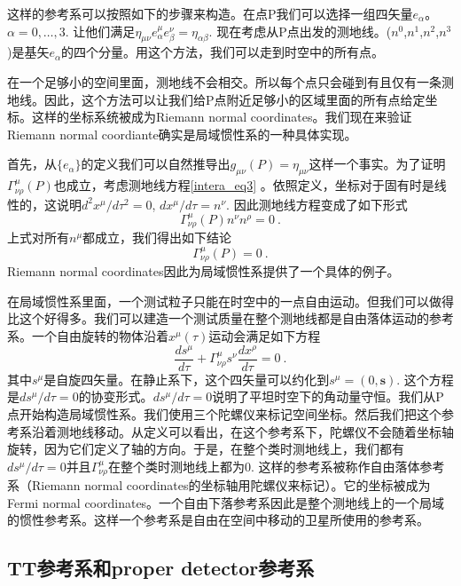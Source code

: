 这样的参考系可以按照如下的步骤来构造。在点P我们可以选择一组四矢量$e_\alpha$。$\alpha = 0,\ldots,3$. 让他们满足$\eta_{\mu\nu}e^\mu_\alpha e^\nu_\beta = \eta_{\alpha\beta}$. 现在考虑从P点出发的测地线。($n^0$,$n^1$,$n^2$,$n^3$)是基矢$e_\alpha$的四个分量。用这个方法，我们可以走到时空中的所有点。

在一个足够小的空间里面，测地线不会相交。所以每个点只会碰到有且仅有一条测地线。因此，这个方法可以让我们给P点附近足够小的区域里面的所有点给定坐标。这样的坐标系统被成为Riemann normal coordinates。我们现在来验证Riemann normal coordiante确实是局域惯性系的一种具体实现。

首先，从$\{e_{\alpha}\}$的定义我们可以自然推导出$g_{\mu\nu}(P) = \eta_{\mu\nu}$这样一个事实。为了证明$\Gamma^\mu_{\nu\rho}(P)$也成立，考虑测地线方程\autoref{intera_eq3} 。依照定义，坐标对于固有时是线性的，这说明$d^2 x^\mu/d \tau^2 = 0$, $dx^\mu/d\tau = n^\nu$. 因此测地线方程变成了如下形式
\begin{equation}
\Gamma^\mu_{\nu\rho} (P) n^\nu n^\rho = 0 ~.
\end{equation}
上式对所有$n^\mu$都成立，我们得出如下结论
\begin{equation}
\Gamma^\mu_{\nu\rho} (P) = 0~.
\end{equation}
Riemann normal coordinates因此为局域惯性系提供了一个具体的例子。

在局域惯性系里面，一个测试粒子只能在时空中的一点自由运动。但我们可以做得比这个好得多。我们可以建造一个测试质量在整个测地线都是自由落体运动的参考系。一个自由旋转的物体沿着$x^\mu(\tau)$运动会满足如下方程
\begin{equation}
\frac{ds^\mu}{d\tau} + \Gamma^\mu_{\nu\rho} s^\nu \frac{dx^\rho}{d\tau} = 0~.
\end{equation}
其中$s^\mu$是自旋四矢量。在静止系下，这个四矢量可以约化到$s^\mu = (0,\mathbf s)$. 这个方程是$ds^\mu/d\tau=0$的协变形式。$ds^\mu/d\tau=0$说明了平坦时空下的角动量守恒。我们从P点开始构造局域惯性系。我们使用三个陀螺仪来标记空间坐标。然后我们把这个参考系沿着测地线移动。从定义可以看出，在这个参考系下，陀螺仪不会随着坐标轴旋转，因为它们定义了轴的方向。于是，在整个类时测地线上，我们都有$ds^\mu/d\tau = 0$并且$\Gamma^\mu_{\nu\rho}$在整个类时测地线上都为0. 这样的参考系被称作自由落体参考系（Riemann normal coordinates的坐标轴用陀螺仪来标记）。它的坐标被成为Fermi normal coordinates。一个自由下落参考系因此是整个测地线上的一个局域的惯性参考系。这样一个参考系是自由在空间中移动的卫星所使用的参考系。

\subsection{TT参考系和proper detector参考系}
